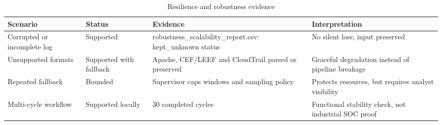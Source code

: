 \begin{table}[t]
\caption{Resilience and robustness evidence}
\label{tab:resilience_agent}
\centering
\scriptsize
\begin{tabularx}{\linewidth}{p{2.4cm}p{1.6cm}X X}
\toprule
\textbf{Scenario} & \textbf{Status} & \textbf{Evidence} & \textbf{Interpretation} \\
\midrule
Corrupted or incomplete log & Supported & robustness\_scalability\_report.csv: kept\_unknown status & No silent loss; input preserved \\
Unsupported formats & Supported with fallback & Apache, CEF/LEEF and CloudTrail parsed or preserved & Graceful degradation instead of pipeline breakage \\
Repeated fallback & Bounded & Supervisor caps windows and sampling policy & Protects resources, but requires analyst visibility \\
Multi-cycle workflow & Supported locally & 30 completed cycles & Functional stability check, not industrial SOC proof \\
\bottomrule
\end{tabularx}
\end{table}
